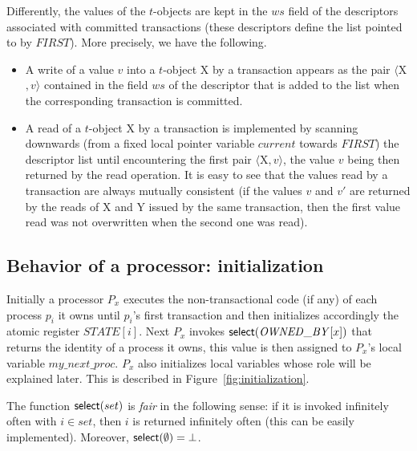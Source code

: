 Differently, the  values of the $t$-objects are kept in the $ws$ field 
of the  descriptors associated with committed transactions
(these descriptors define the list pointed to by $\mathit{FIRST}$). 
More precisely,  we have the following.
\begin{itemize}
\item
A  write of a value $v$ into a $t$-object {\sc X}  by a transaction 
appears as the  pair  $\langle${\sc X}$,v \rangle$ contained in the 
field $ws$ of the descriptor  that is added to the list when the
corresponding transaction is committed. 
\item
A read of a $t$-object {\sc X} by a transaction is implemented by 
scanning  downwards (from a fixed local pointer variable $current$ towards $\mathit{FIRST}$)
the  descriptor list until encountering 
the first pair $\langle${\sc X}$,v \rangle$, the value $v$ being then 
returned by the read operation. It is easy to see that the values read by a 
transaction are always mutually consistent (if the values $v$ and $v'$ are 
returned by the reads of {\sc X} and {\sc Y} issued by the same transaction, 
then the first  value read  was not overwritten when the second one was read). 
\end{itemize}


\subsection{Behavior of a processor: initialization}
Initially a   processor $P_x$ executes the non-transactional  code (if any)
of each process $p_i$ it owns  
until $p_i$'s first transaction and then 
initializes accordingly the  atomic register
$\mathit{STATE}[i]$. 
Next  $P_x$ invokes  ${\sf select}(\mathit{OWNED\_BY}[x])$
that returns the identity of a process it owns, this value is then assigned
to $P_x$'s local  
variable  $my\_next\_proc$. $P_x$ also initializes local variables
whose role  will be explained later.
This is described in Figure~\ref{fig:initialization}. 


The function ${\sf select}(set)$ is {\it fair} in the following sense:
if it is invoked infinitely often with $i\in set$,  then $i$ is returned
infinitely often (this can be easily implemented).
Moreover, ${\sf select}(\emptyset)=\bot$.  



